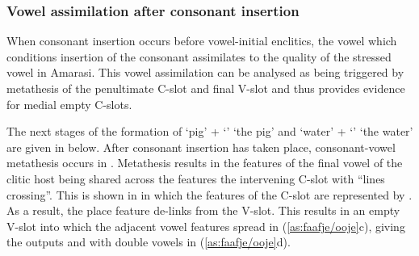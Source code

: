 \subsubsection{Vowel assimilation after consonant insertion}\label{sec:EmpCSloVowAssConIns}
When consonant insertion occurs before vowel-initial enclitics,
the vowel which conditions insertion of the consonant assimilates
to the quality of the stressed vowel in Amarasi.
This vowel assimilation can be analysed as being triggered
by metathesis of the penultimate C-slot and final V-slot
and thus provides evidence for medial empty C-slots.

The next stages of the formation of  `pig' +  `{\ee}'  `the pig'
and  `water' +  `{\ee}' {\ra}  `the water'
are given in  below.
After consonant insertion has taken place,
consonant-vowel metathesis occurs in .
Metathesis results in the features of the final vowel of the clitic host
being shared across the features the intervening C-slot with ``lines crossing''.
This is shown in  in which the features of the C-slot are represented by \tsc{[c.]}.
As a result, the place feature \tsc{[+front]} de-links from the V-slot.
This results in an empty V-slot into which the adjacent vowel features spread in (\ref{as:faafje/ooje}c),
giving the outputs  and  with double vowels in (\ref{as:faafje/ooje}d).

